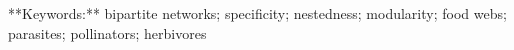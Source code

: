 **Keywords:** bipartite networks; specificity; nestedness; modularity;
food webs; parasites; pollinators; herbivores
